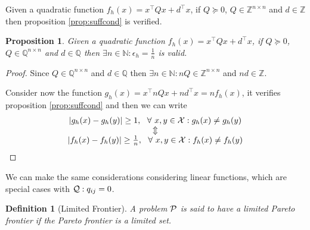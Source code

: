 \documentclass{article}
\newtheorem{proposition}[theorem]{Proposition}
\newtheorem{definition}{Definition}
\def\setN{\mathbb{N}}
\def\setZ{\mathbb{Z}}
\def\ds{\displaystyle}
\def\X{{\cal X}}
\begin{document}
		Given a  quadratic function $f_h(x) = x^\intercal Q x + d^\intercal x $, if $Q\succcurlyeq 0 $, $Q \in {\setZ}^{n\times n}$ and $d \in \setZ$ then proposition \ref{prop:suffcond} is verified.
		
	    \begin{proposition}
	    	Given a  quadratic function $f_h(x) = x^\intercal Q x + d^\intercal x $, if $Q\succcurlyeq 0 $, $Q \in \mathbb{ Q}^{n\times n}$ and $d \in \mathbb{Q}$ then $\ds \exists n \in \setN : \epsilon_h = \frac{1}{n}$ is valid.
	    \end{proposition}
	    \begin{proof}
	    	Since $Q \in \mathbb{ Q}^{n\times n}$ and $d \in \mathbb{Q}$ then $ \ds \exists n \in \setN : nQ \in {\setZ}^{n\times n}$ and $nd \in \setZ$. 
	    	
	    	Consider now the function $g_h(x) = x^\intercal nQ x + nd^\intercal x = n f_h(x)$, it verifies proposition \ref{prop:suffcond} and then we can write
	    	$$
	    	\begin{array}{c}
	    	 | g_h(x) - g_h(y) | \ge 1, \ \ \forall \ x,y \in \X : g_h(x) \neq g_h(y) \\
	    	 \Updownarrow
	    	 \\
	    	  | f_h(x) - f_h(y) | \ge \frac{1}{n}, \ \ \forall \ x,y \in \X : f_h(x) \neq f_h(y) 
	    	\end{array}
	    	$$
	    \end{proof}
	    
	    We can make the same considerations considering linear functions, which are special cases with ${\cal Q} : q_{i j} = 0$.
	    
	    
	    
	    \begin{definition}[Limited Frontier]
	    	A problem $\cal P$ is said to have a limited Pareto frontier if the Pareto frontier  is a limited set.
	    \end{definition}
	    
\end{document}
